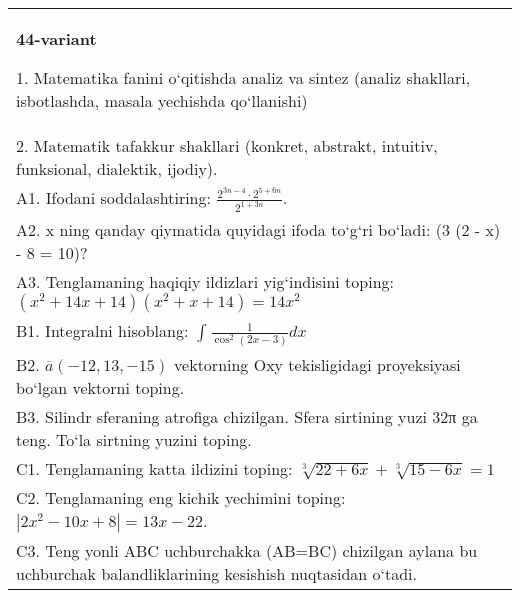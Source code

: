 \documentclass{article}
\begin{document}
\begin{tabular}{m{17cm}}
\textbf{44-variant}

1. Matematika fanini o‘qitishda analiz va sintez (analiz shakllari, isbotlashda, masala yechishda qo‘llanishi) \\
2. Matematik tafakkur shakllari (konkret, abstrakt, intuitiv, funksional, dialektik, ijodiy). \\
A1. Ifodani soddalashtiring: \(\frac{2^{3n - 4} \cdot 2^{5 + 6n}}{2^{1 + 3n}}\). \\
A2. x ning qanday qiymatida quyidagi ifoda to‘g‘ri bo‘ladi: (3 (2 - x) - 8 = 10)? \\
A3. Tenglamaning haqiqiy ildizlari yig‘indisini toping: \((x^2 + 14x + 14) (x^2 + x + 14) = 14x^2\) \\
B1. Integralni hisoblang: \(\int_{}^{}{\frac{1}{\cos^{2} (2x - 3) }dx}\) \\
B2. \(\overline{a} (- 12,13, - 15) \) vektorning Oxy tekisligidagi proyeksiyasi bo‘lgan vektorni toping. \\
B3. Silindr sferaning atrofiga chizilgan. Sfera sirtining yuzi 32π ga teng. To‘la sirtning yuzini toping. \\
C1. Tenglamaning katta ildizini toping: \(\sqrt[3]{22 + 6x} + \sqrt[3]{15 - 6x} = 1\) \\
C2. Tenglamaning eng kichik yechimini toping: \(\left| 2x^2 - 10x + 8 \right| = 13x - 22\). \\
C3. Teng yonli ABC uchburchakka (AB=BC) chizilgan aylana bu uchburchak balandliklarining kesishish nuqtasidan o‘tadi. \\

\end{tabular}
\vspace{1cm}
\end{document}

